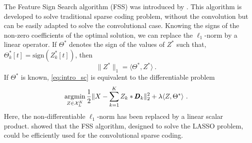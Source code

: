 \documentclass[../thesis.tex]{subfiles}
\begin{document}

	The Feature Sign Search algorithm (FSS) was introduced by \citet{Lee2007}. This
	algorithm is developed to solve traditional sparse coding problem, without the
	convolution but can be easily adapted to solve the convolutional case. Knowing
	the signs of the non-zero coefficients of the optimal solution, we can replace
	the $\ell_1$-norm by a linear operator. If $\Theta^*$ denotes the sign of the
	values of $Z^*$ such that, $\Theta^*_k[t] = \text{sign}(Z^*_k[t])$, then
	\begin{equation}
		\|Z^*\|_1 = \langle \Theta^*, Z^*\rangle~.
	\end{equation}
	If $\Theta^*$ is known, \autoref{eq:intro_sc} is equivalent to the
	differentiable problem
	\begin{equation}
		\label{eq:conv_qp}
		\operatorname*{\arg\!\min}_{Z \in {\mathcal X}_L^K} \frac{1}{2} \|X - \sum_{k=1}^K Z_k*{\pmb D}_k\|_2^2
		+ \lambda\langle Z, \Theta^*\rangle~.
	\end{equation}
	Here, the non-differentiable $\ell_1$-norm has been replaced by a linear
	scalar product. \citet{Grosse2007} showed that the FSS algorithm, designed
	to solve the LASSO problem, could be efficiently used for the convolutional
	sparse coding.
\end{document}
